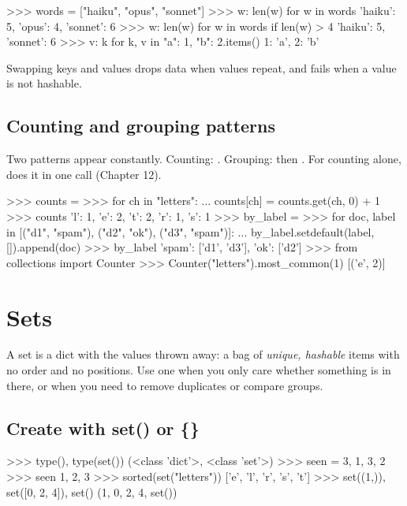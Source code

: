 \begin{pycode}
>>> words = ["haiku", "opus", "sonnet"]
>>> {w: len(w) for w in words}
{'haiku': 5, 'opus': 4, 'sonnet': 6}
>>> {w: len(w) for w in words if len(w) > 4}
{'haiku': 5, 'sonnet': 6}
>>> {v: k for k, v in {"a": 1, "b": 2}.items()}
{1: 'a', 2: 'b'}
\end{pycode}

Swapping keys and values drops data when values repeat, and fails when a value is not hashable.

\subsection{Counting and grouping patterns}

Two patterns appear constantly. Counting: . Grouping: 
then . For counting alone,  does it in one call (Chapter 12).

\begin{pycode}
>>> counts = {}
>>> for ch in "letters":
...     counts[ch] = counts.get(ch, 0) + 1
>>> counts
{'l': 1, 'e': 2, 't': 2, 'r': 1, 's': 1}
>>> by_label = {}
>>> for doc, label in [("d1", "spam"), ("d2", "ok"), ("d3", "spam")]:
...     by_label.setdefault(label, []).append(doc)
>>> by_label
{'spam': ['d1', 'd3'], 'ok': ['d2']}
>>> from collections import Counter
>>> Counter("letters").most_common(1)
[('e', 2)]
\end{pycode}

\section{Sets}

A set is a dict with the values thrown away: a bag of \emph{unique, hashable} items with no order and no
positions. Use one when you only care whether something is in there, or when you need to remove duplicates
or compare groups.

\subsection{Create with set() or \{\}}

\begin{pycode}
>>> type({}), type(set())
(<class 'dict'>, <class 'set'>)
>>> seen = {3, 1, 3, 2}
>>> seen
{1, 2, 3}
>>> sorted(set("letters"))
['e', 'l', 'r', 's', 't']
>>> set((1,)), set([0, 2, 4]), set()
({1}, {0, 2, 4}, set())
\end{pycode}

